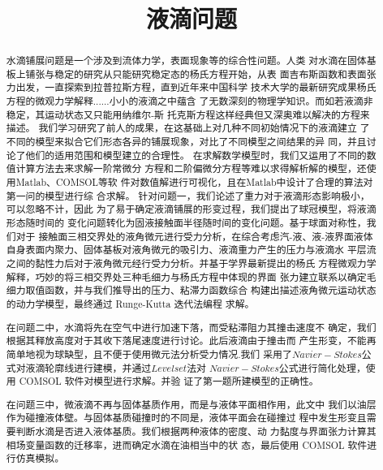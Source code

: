 \documentclass{cumcmthesis}
\title{液滴问题}\tihao{A}
\begin{document}
\maketitle

\begin{abstract}    水滴铺展问题是一个涉及到流体力学，表面现象等的综合性问题。人类
    对水滴在固体基板上铺张与稳定的研究从只能研究稳定态的杨氏方程开始，从表
    面吉布斯函数和表面张力出发，一直探索到拉普拉斯方程，直到近年来中国科学
    技术大学的最新研究成果杨氏方程的微观力学解释......小小的液滴之中蕴含
    了无数深刻的物理学知识。而如若液滴非稳定，其运动状态又只能用纳维尔-斯
    托克斯方程这样经典但又深奥难以解决的方程来描述。 
    我们学习研究了前人的成果，在这基础上对几种不同初始情况下的液滴建立
    了不同的模型来拟合它们形态各异的铺展现象，对比了不同模型之间结果的异
    同，并且讨论了他们的适用范围和模型建立的合理性。 
    在求解数学模型时，我们又运用了不同的数值计算方法去来求解一阶常微分
    方程和二阶偏微分方程等难以求得解析解的模型，还使用Matlab、COMSOL等软
    件对数值解进行可视化，且在Matlab中设计了合理的算法对第一问的模型进行综
    合求解。 
    \cite{mckean1970nagumo}
    \cite{rossler1979equation}
    \cite{rossler1979equation}
    针对问题一，我们论述了重力对于液滴形态影响极小，可以忽略不计，因此
    为了易于确定液滴铺展的形变过程，我们提出了球冠模型，将液滴形态随时间的
    变化问题转化为固液接触面半径随时间的变化问题。基于球面对称性，我们对于
    接触面三相交界处的液角微元进行受力分析，在综合考虑汽-液、液-液界面液体
    自身表面内聚力、固体基板对液角微元的吸引力、液滴重力产生的压力与液滴水
    平层流之间的黏性力后对于液角微元经行受力分析。并基于学界最新提出的杨氏
    方程微观力学解释，巧妙的将三相交界处三种毛细力与杨氏方程中体现的界面
    张力建立联系以确定毛细力取值函数，并与我们推导出的压力、粘滞力函数综合
    构建出描述液角微元运动状态的动力学模型，最终通过 Runge-Kutta 迭代法编程
    求解。 
    
    在问题二中，水滴将先在空气中进行加速下落，而受粘滞阻力其撞击速度不
    确定，我们根据其释放高度对于其收下落尾速度进行讨论。此后液滴由于撞击而
    产生形变，不能再简单地视为球缺型，且不便于使用微元法分析受力情况.我们
    采用了$Navier-Stokes$公式对液滴轮廓线进行建模，并通过$Level set$法对
    $Navier-Stokes$公式进行简化处理，使用 COMSOL 软件对模型进行求解。并验
    证了第一题所建模型的正确性。
    
    在问题三中，微液滴不再与固体基质作用，而是与液体平面相作用，此文中
    我们以油层作为碰撞液体壁。与固体基质碰撞时的不同是，液体平面会在碰撞过
    程中发生形变且需要判断水滴是否进入液体基质。我们根据两种液体的密度、动
    力黏度与界面张力计算其相场变量函数的迁移率，进而确定水滴在油相当中的状
    态，最后使用 COMSOL 软件进行仿真模拟。
    
\end{abstract}
\end{document}
